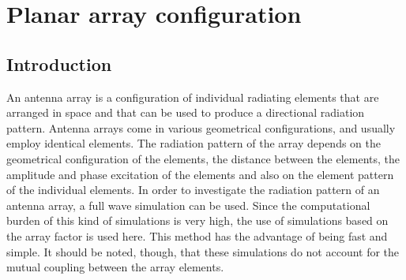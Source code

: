 \documentclass[titlepage]{article}
\begin{document}
\section{Planar array configuration}
\subsection{Introduction}
An antenna array is a configuration of individual radiating elements that are arranged in space and that can be used to produce a directional radiation pattern. Antenna arrays come in various geometrical configurations, and usually employ identical elements. The radiation pattern of the array depends on the geometrical configuration of the elements, the distance between the elements, the amplitude and phase excitation of the elements and also on the element pattern of the individual elements.
\newline
In order to investigate the radiation pattern of an antenna array, a full wave simulation can be used. Since the computational burden of this kind of simulations is very high, the use of simulations based on the array factor is used here. This method has the advantage of being fast and simple. It should be noted, though, that these simulations do not account for the mutual coupling between the array elements.
\end{document}

